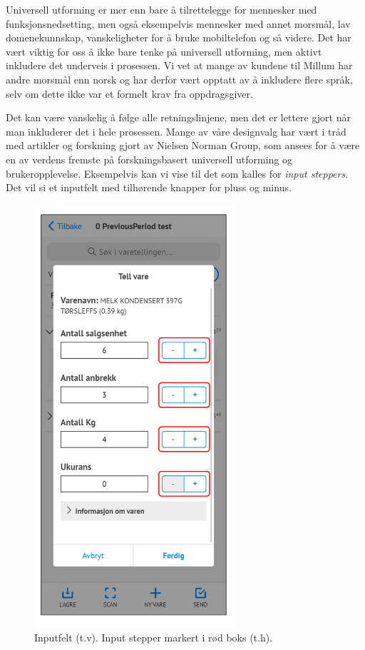 Universell utforming er mer enn bare å tilrettelegge for mennesker med funksjonsnedsetting, men også eksempelvis mennesker med annet morsmål, lav domenekunnskap, vanskeligheter for å bruke mobiltelefon og så videre. Det har vært viktig for oss å ikke bare tenke på universell utforming, men aktivt inkludere det underveis i prosessen. Vi vet at mange av kundene til Millum har andre morsmål enn norsk og har derfor vært opptatt av å inkludere flere språk, selv om dette ikke var et formelt krav fra oppdragsgiver.

Det kan være vanskelig å følge alle retningslinjene, men det er lettere gjort når man inkluderer det i hele prosessen. Mange av våre designvalg har vært i tråd med artikler og forskning gjort av Nielsen Norman Group, som ansees for å være en av verdens fremste på forskningsbasert universell utforming og brukeropplevelse. Eksempelvis kan vi vise til det som kalles for \textit{input steppers}. Det vil si et inputfelt med tilhørende knapper for pluss og minus. 
\begin{figure}[H] 
    \centering
    \includegraphics[width=75mm]{figures/Design-utforming/universell-utforming.jpg}
    \caption{Inputfelt (t.v). Input stepper markert i rød boks (t.h).}
    \label{fig:DesignInputStepper}
\end{figure}


